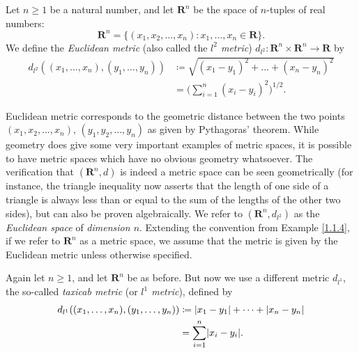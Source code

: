 \begin{example}\label{1.1.6}
    Let \(n \geq 1\) be a natural number, and let \(\mathbf{R}^n\) be the space of \(n\)-tuples of real numbers:
    \[
        \mathbf{R}^n = \{(x_1, x_2, \dots, x_n) : x_1, \dots, x_n \in \mathbf{R}\}.
    \]
    We define the \emph{Euclidean metric} (also called the \emph{\(l^2\) metric}) \(d_{l^2} : \mathbf{R}^n \times\mathbf{R}^n \to \mathbf{R}\) by
    \begin{align*}
        d_{l^2}((x_1, \dots, x_n), (y_1, \dots, y_n)) & \coloneqq \sqrt{(x_1 - y_1)^2 + \dots + (x_n - y_n)^2} \\
                                                      & = \bigg(\sum_{i = 1}^n (x_i - y_i)^2\bigg)^{1 / 2}.
    \end{align*}
\end{example}

\begin{note}
    Euclidean metric corresponds to the geometric distance between the two points \((x_1, x_2, \dots, x_n)\), \((y_1, y_2, \dots, y_n)\) as given by Pythagoras' theorem.
    While geometry does give some very important examples of metric spaces, it is possible to have metric spaces which have no obvious geometry whatsoever.
    The verification that \((\mathbf{R}^n, d)\) is indeed a metric space can be seen geometrically (for instance, the triangle inequality now asserts that the length of one side of a triangle is always less than or equal to the sum of the lengths of the other two sides), but can also be proven algebraically.
    We refer to \((\mathbf{R}^n , d_{l^2})\) as the \emph{Euclidean space} of \emph{dimension \(n\)}.
    Extending the convention from Example \ref{1.1.4}, if we refer to \(\mathbf{R}^n\) as a metric space, we assume that the metric is given by the Euclidean metric unless otherwise specified.
\end{note}

\begin{example}\label{1.1.7}
    Again let \(n \geq 1\), and let \(\mathbf{R}^n\) be as before.
    But now we use a different metric \(d_{l^1}\), the so-called \emph{taxicab metric} (or \emph{\(l^1\) metric}), defined by
    \begin{align*}
        d_{l^1}((x_1, \dots, x_n), (y_1, \dots, y_n)) & \coloneqq \abs*{x_1 - y_1} + \dots + \abs*{x_n - y_n} \\
                                                      & = \sum_{i = 1}^n \abs*{x_i - y_i}.
    \end{align*}
\end{example}